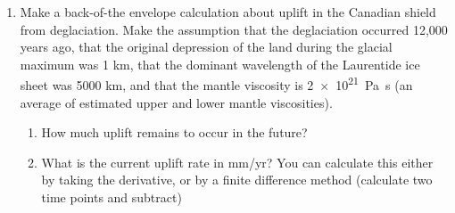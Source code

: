 \documentclass{template}
\newcommand{\solution}[1]{%
\iftoggle{showanswers}{%
\begin{solutionbox}
        #1
\end{solutionbox}%
  }{}%
}
\begin{document}
\begin{enumerate}[label=\textbf{\arabic*.}]
\newpage
\item Make a back-of-the envelope calculation about uplift in the Canadian shield from deglaciation. Make the assumption that the deglaciation occurred 12,000 years ago, that the original depression of the land during the glacial maximum was 1 km, that the dominant wavelength of the Laurentide ice sheet was 5000 km, and that the mantle viscosity is \qty{2e21}{\Pa\s} (an average of estimated upper and lower mantle viscosities).

\begin{enumerate}[label=\Alph*)]

    \item How much uplift remains to occur in the future?

    \solution{

        $$ E = E_0\cdot e^{-t/\tau};\quad \tau = \frac{4 \pi \eta}{\rho g \lambda} $$

        \begin{align*}
            \tau &= \frac{4 \pi \cdot \qty{2e21}{\Pa\s}}{\qty{3300}{\kg\per\m\cubed} \cdot \qty{9.81}{\m\per\s\squared} \cdot \qty{5e6}{\m}} \\
            &\approx \qty{1.55e11}{\s} \approx \qty{4.9e3}{yr}\\
            E &= \qty{1}{\km}\cdot e^{-(\qty{12000}{\km})/(\qty{4.9e3}{yr})}\\
            &\approx \boxed{\qty{87.3}{\m}}
        \end{align*}

        About \qty{87}{\m} of uplift remains to occur.

    }

    \item What is the current uplift rate in mm/yr? You can calculate this either by taking the derivative, or by a finite difference method (calculate two time points and subtract)

    \solution{
        Using the derivative of the relaxation law:

        \begin{align*}
            \frac{dE}{dt} = -\frac{E_0}{\tau} e^{-t/\tau} = -\frac{E}{\tau}
        \end{align*}

        The present uplift rate is:

        \begin{align*}
            \left|\frac{dE}{dt}\right| &= \frac{\qty{87}{\m}}{\qty{4.9e3}{ yr}}\\
            &\approx \boxed{\qty{1.8e-2}{\m\per yr}} \approx \qty{18}{\mm\per yr}
        \end{align*}
    }


\end{enumerate}
\end{enumerate}
\end{document}
